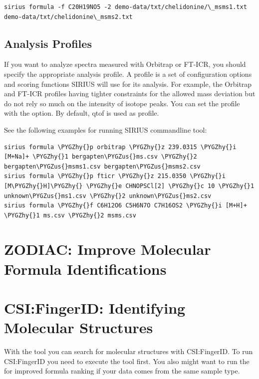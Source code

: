\documentclass[letterpaper,10pt,openany,oneside]{sphinxmanual}
\def\PYGZus{\char`\_}
\def\PYGZhy{\char`\-}
\begin{document}
\begin{Verbatim}[commandchars=\\\{\}]
sirius formula -f C20H19NO5 -2 demo-data/txt/chelidonine/\_msms1.txt demo-data/txt/chelidonine\_msms2.txt
\end{Verbatim}

\subsection*{Analysis Profiles}
If you want to analyze spectra measured with Orbitrap or FT-ICR, you should specify the appropriate analysis profile. A profile is a set of configuration options and scoring functions SIRIUS will use for its analysis. For example, the Orbitrap and FT-ICR profiles having tighter constraints for the allowed mass deviation but do not rely so much on the intensity of isotope peaks. You can set the profile with the  option. By default, qtof is used as profile.


See the following examples for running SIRIUS commandline tool:

\begin{Verbatim}[commandchars=\\\{\}]
sirius formula \PYGZhy{}p orbitrap \PYGZhy{}z 239.0315 \PYGZhy{}i [M+Na]+ \PYGZhy{}1 bergapten\PYGZus{}ms.csv \PYGZhy{}2 bergapten\PYGZus{}msms1.csv bergapten\PYGZus{}msms2.csv
sirius formula \PYGZhy{}p fticr \PYGZhy{}z 215.0350 \PYGZhy{}i [M\PYGZhy{}H]\PYGZhy{} \PYGZhy{}e CHNOPSCl[2] \PYGZhy{}c 10 \PYGZhy{}1 unknown\PYGZus{}ms1.csv \PYGZhy{}2 unknown\PYGZus{}ms2.csv
sirius formula \PYGZhy{}f C6H12O6 C5H6N7O C7H16OS2 \PYGZhy{}i [M+H]+ \PYGZhy{}1 ms.csv \PYGZhy{}2 msms.csv
\end{Verbatim}

\section{ZODIAC: Improve Molecular Formula Identifications}


\section{CSI:FingerID: Identifying Molecular Structures}
\label{commandline:identifying-molecular-structures}

With the  tool you can search for molecular structures with
CSI:FingerID. To run CSI:FingerID you need to execute the  tool first. You also might want to run the  for improved formula ranking if your data comes from the same sample type. 
\end{document}
